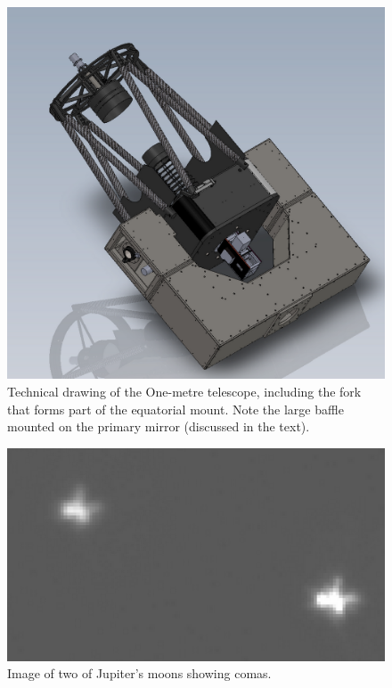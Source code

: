\documentclass[a4paper,fleqn,usenatbib]{mnras}
\begin{document}
\begin{figure}
	\includegraphics[width=\columnwidth]{images/telescope.png}
    \caption{Technical drawing of the One-metre telescope, including the fork that forms part of the equatorial mount.  Note the large baffle mounted on the primary mirror (discussed in the text).}
    \label{fig:telescope}
\end{figure}

\begin{figure}
	\includegraphics[width=\columnwidth]{images/comas.png}
    \caption{Image of two of Jupiter's moons showing comas.}
    \label{fig:coma}
\end{figure}
\end{document}
